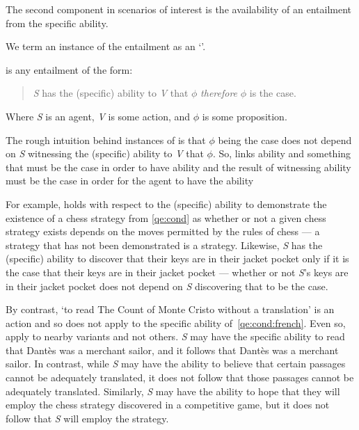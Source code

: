 \begin{note}
  The second component in scenarios of interest is the availability of an entailment from the specific ability.

  We term an instance of the entailment as an `\aben{}'.

  \begin{definition}\label{def:aben}
     is any entailment of the form:
    \begin{quote}
      \emph{S} has the (specific) ability to \emph{V} that \(\phi\) \emph{therefore} \(\phi\) is the case.
    \end{quote}
    Where \emph{S} is an agent, \emph{V} is some action, and \(\phi\) is some proposition.
  \end{definition}

  The rough intuition behind instances of  is that \(\phi\) being the case does not depend on \emph{S} witnessing the (specific) ability to \emph{V} that \(\phi\).
  So,  links ability and something that must be the case in order to have ability and the result of witnessing ability must be the case in order for the agent to have the ability

  For example,  holds with respect to the (specific) ability to demonstrate the existence of a chess strategy from \ref{qe:cond} as whether or not a given chess strategy exists depends on the moves permitted by the rules of chess --- a strategy that has not been demonstrated is a strategy.
  Likewise, \emph{S} has the (specific) ability to discover that their keys are in their jacket pocket only if it is the case that their keys are in their jacket pocket --- whether or not \emph{S}'s keys are in their jacket pocket does not depend on \emph{S} discovering that to be the case.

  By contrast, `to read The Count of Monte Cristo without a translation' is an action and so  does not apply to the specific ability of~\ref{qe:cond:french}.
  Even so,  apply to nearby variants and not others.
  \emph{S} may have the specific ability to read that Dantès was a merchant sailor, and it follows that Dantès was a merchant sailor.
  In contrast, while \emph{S} may have the ability to believe that certain passages cannot be adequately translated, it does not follow that those passages cannot be adequately translated.
  Similarly, \emph{S} may have the ability to hope that they will employ the chess strategy discovered in a competitive game, but it does not follow that \emph{S} will employ the strategy.


\end{note}
